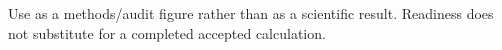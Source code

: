 Use as a methods/audit figure rather than as a scientific result. Readiness does not substitute for a completed accepted calculation.
